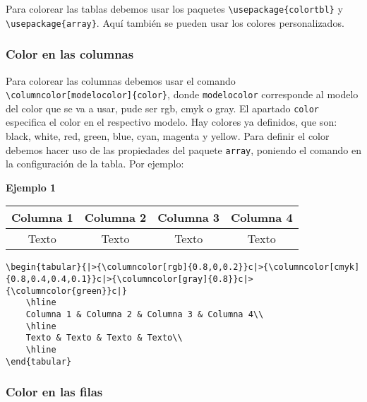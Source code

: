Para colorear las tablas debemos usar los paquetes \verb|\usepackage{colortbl}| y\\ \verb|\usepackage{array}|. Aquí también se pueden usar los colores personalizados.

\subsubsection{Color en las columnas}

Para colorear las columnas debemos usar el comando \verb|\columncolor[modelocolor]{color}|, donde \verb|modelocolor| corresponde al modelo del color que se va a usar, pude ser rgb, cmyk o gray. El apartado \verb|color| especifica el color en el respectivo modelo. Hay colores ya definidos, que son: black, white, red, green, blue,
cyan, magenta y yellow. Para definir el color debemos hacer uso de las propiedades del paquete \verb|array|, poniendo el comando en la configuración de la tabla. Por ejemplo:

\textbf{Ejemplo 1}

\begin{center}	
	\begin{tabular}{|>{\columncolor[rgb]{0.8,0,0.2}}c|>{\columncolor[cmyk]{0.8,0.4,0.4,0.1}}c|>{\columncolor[gray]{0.8}}c|>{\columncolor{green}}c|}
		\hline
		Columna 1 & Columna 2 & Columna 3 & Columna 4\\		
		\hline
		Texto & Texto & Texto & Texto\\
		\hline
	\end{tabular}
\end{center}

\begin{myquote}
	\begin{lstlisting}
\begin{tabular}{|>{\columncolor[rgb]{0.8,0,0.2}}c|>{\columncolor[cmyk]{0.8,0.4,0.4,0.1}}c|>{\columncolor[gray]{0.8}}c|>{\columncolor{green}}c|}    
	\hline
	Columna 1 & Columna 2 & Columna 3 & Columna 4\\		
	\hline
	Texto & Texto & Texto & Texto\\
	\hline
\end{tabular}		
	\end{lstlisting}			
\end{myquote}


\subsubsection{Color en las filas}

